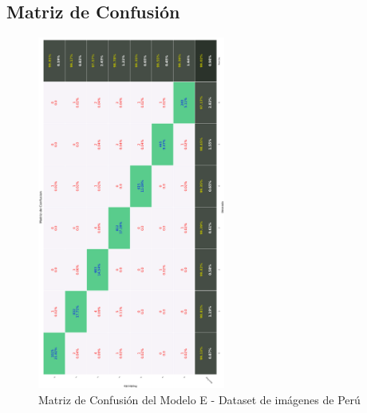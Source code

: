 	 	\subsection{Matriz de Confusión}  
			\begin{figure}[H]
				\begin{center}
				\includegraphics[width=0.55\textwidth]{images/desarrollo/testResults/peru/modelE_} 
				\end{center}
				\begin{center}
				\caption{\small{Matriz de Confusión del Modelo E - Dataset de imágenes de Perú}}
				
				{\small{\fontsize{10}{16.8}\selectfont {Fuente: Elaboración propia}}}
				\end{center}
				\vspace{-1.5em}
			\end{figure}
